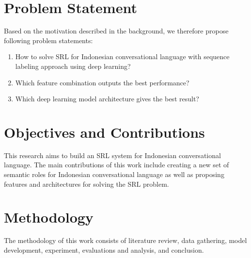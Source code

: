 \section{Problem Statement}
Based on the motivation described in the background, we therefore propose following problem statements:
\begin{enumerate}
	\item How to solve SRL for Indonesian conversational language with sequence labeling approach using deep learning? 
	\item Which feature combination outputs the best performance?
	\item Which deep learning model architecture gives the best result?
\end{enumerate}

\section{Objectives and Contributions}
This research aims to build an SRL system for Indonesian conversational language. The main contributions of this work include creating a new set of semantic roles for Indonesian conversational language as well as proposing features and architectures for solving the SRL problem.

\section{Methodology}
The methodology of this work consists of literature review, data gathering, model development, experiment, evaluations and analysis, and conclusion.

